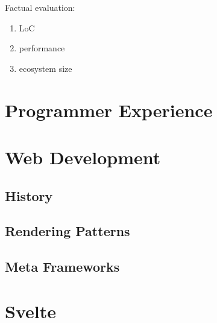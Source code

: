 Factual evaluation:
\begin{enumerate}
    \item LoC 
    \item performance
    \item ecosystem size
\end{enumerate}

\section{Programmer Experience}


\section{Web Development}
\label{sec:web-development}

\subsection{History}

\subsection{Rendering Patterns}

\subsection{Meta Frameworks}

\section{Svelte}




